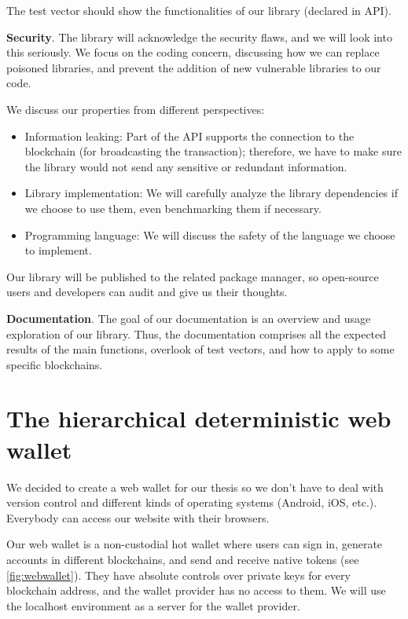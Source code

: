 The test vector should show the functionalities of our library (declared in API).

\bigskip
{\textbf{Security}}. The library will acknowledge the security flaws, and we will look into this seriously. We focus on the coding concern, discussing how we can replace poisoned libraries, and prevent the addition of new vulnerable libraries to our code.

We discuss our properties from different perspectives:

\begin{itemize}
    \item Information leaking: Part of the API supports the connection to the blockchain (for broadcasting the transaction); therefore, we have to make sure the library would not send any sensitive or redundant information.
    \item Library implementation: We will carefully analyze the library dependencies if we choose to use them, even benchmarking them if necessary.
    \item Programming language: We will discuss the safety of the language we choose to implement.
\end{itemize}

Our library will be published to the related package manager, so open-source users and developers can audit and give us their thoughts.

\bigskip
{\textbf{Documentation}}. The goal of our documentation is an overview and usage exploration of our library. Thus, the documentation comprises all the expected results of the main functions, overlook of test vectors, and how to apply to some specific blockchains.



\section{The hierarchical deterministic web wallet}
We decided to create a web wallet for our thesis so we don’t have to deal with version control and different kinds of operating systems (Android, iOS, etc.). Everybody can access our website with their browsers.

Our web wallet is a non-custodial hot wallet where users can sign in, generate accounts in different blockchains, and send and receive native tokens (see \autoref{fig:webwallet}). They have absolute controls over private keys for every blockchain address, and the wallet provider has no access to them. We will use the localhost environment as a server for the wallet provider.

